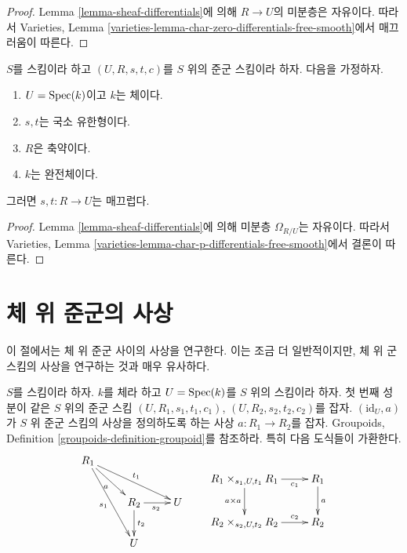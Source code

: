 \begin{proof}
Lemma \ref{lemma-sheaf-differentials}에 의해 $R \to U$의 미분층은
자유이다. 따라서 Varieties, Lemma
\ref{varieties-lemma-char-zero-differentials-free-smooth}에서 매끄러움이 따른다.
\end{proof}

\begin{lemma}
\label{lemma-reduced-group-scheme-perfect-field-characteristic-p-smooth}
$S$를 스킴이라 하고 $(U, R, s, t, c)$를 $S$ 위의 준군 스킴이라 하자.
다음을 가정하자.
\begin{enumerate}
\item $U = \mathop{\mathrm{Spec}}(k)$이고 $k$는 체이다.
\item $s, t$는 국소 유한형이다.
\item $R$은 축약이다.
\item $k$는 완전체이다.
\end{enumerate}
그러면 $s, t : R \to U$는 매끄럽다.
\end{lemma}

\begin{proof}
Lemma \ref{lemma-sheaf-differentials}에 의해 미분층 $\Omega_{R/U}$는 자유이다.
따라서 Varieties, Lemma
\ref{varieties-lemma-char-p-differentials-free-smooth}에서 결론이 따른다.
\end{proof}










\section{체 위 준군의 사상}
\label{section-morphisms-groupoids-on-fields}

\noindent
이 절에서는 체 위 준군 사이의 사상을 연구한다. 이는 조금 더 일반적이지만,
체 위 군 스킴의 사상을 연구하는 것과 매우 유사하다.

\begin{situation}
\label{situation-morphism-groupoids-on-field}
$S$를 스킴이라 하자. $k$를 체라 하고 $U = \mathop{\mathrm{Spec}}(k)$를 $S$ 위의
스킴이라 하자. 첫 번째 성분이 같은 $S$ 위의 준군 스킴
$(U, R_1, s_1, t_1, c_1)$, $(U, R_2, s_2, t_2, c_2)$를 잡자.
$(\text{id}_U, a)$가 $S$ 위 준군 스킴의 사상을 정의하도록 하는 사상
$a : R_1 \to R_2$를 잡자. Groupoids, Definition
\ref{groupoids-definition-groupoid}를 참조하라. 특히 다음 도식들이 가환한다.
$$
\vcenter{
\xymatrix{
R_1 \ar[rrd]^{t_1} \ar[rdd]_{s_1} \ar[rd]_a \\
& R_2 \ar[d]^{t_2} \ar[r]_{s_2} & U \\
& U
}
}
\quad\quad
\vcenter{
\xymatrix{
R_1 \times_{s_1, U, t_1} R_1 \ar[r]_-{c_1} \ar[d]_{a \times a} &
R_1 \ar[d]^a \\
R_2 \times_{s_2, U, t_2} R_2 \ar[r]^-{c_2} &
R_2
}
}
$$
\end{situation}

